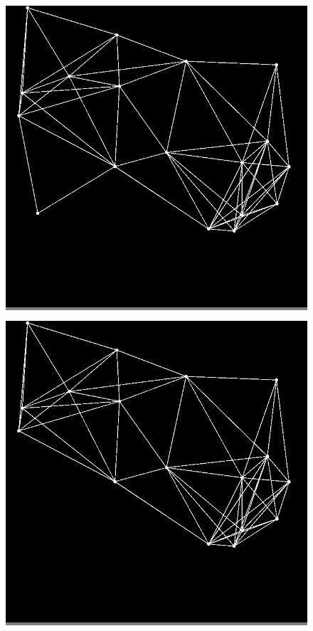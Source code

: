 \documentclass{article}
\begin{document}
\begin{figure}
\begin{minipage}{0.2\textwidth}
            \end{minipage}
            \hspace{\fill}
            \begin{minipage}{0.2\textwidth}
            \colorbox{gray}{\includegraphics[width=\linewidth]{./images/slvo-2.png}}
            \end{minipage}
            \hspace{\fill}
            \begin{minipage}{0.2\textwidth}
            \colorbox{gray}{\includegraphics[width=\linewidth]{./images/slvo-3.png}}

\end{minipage}
\end{figure}
\end{document}
